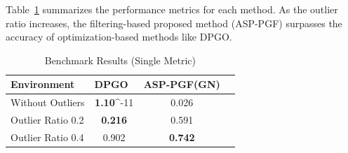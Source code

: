 Table~\ref{tab:benchmark_results} summarizes the performance metrics for each method.
As the outlier ratio increases, the filtering-based proposed method (ASP-PGF) surpasses the accuracy of optimization-based methods like DPGO.

\begin{table}[H]
  \centering
  \caption{Benchmark Results (Single Metric)}
  \label{tab:benchmark_results}
  \begin{tabular}{@{}lccc@{}}
    \toprule
    Environment & DPGO~\cite{Tian2021} & ASP-PGF(GN) \\
    \midrule
    Without Outliers & \textbf{1.10}\times 10^{-11} & 0.026 \\
    Outlier Ratio 0.2 & \textbf{0.216} & 0.591 \\
    Outlier Ratio 0.4 & 0.902 & \textbf{0.742} \\
    \bottomrule
  \end{tabular}
\end{table}
